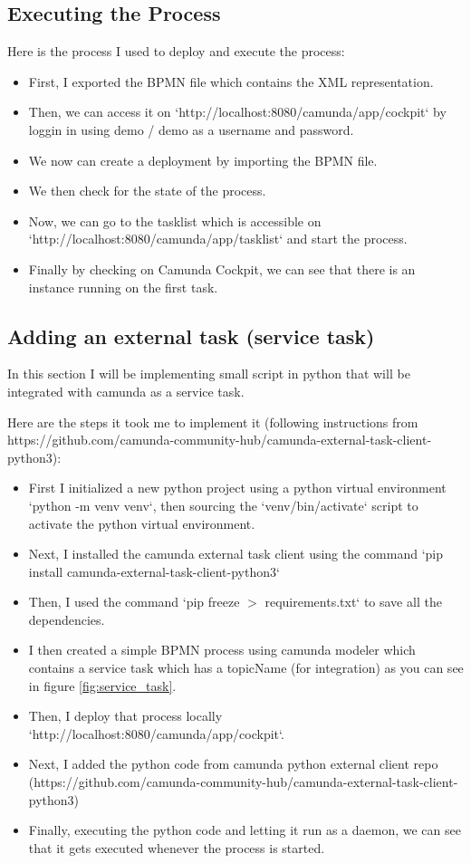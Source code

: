 \documentclass[12pt]{article}
\begin{document}
{  \subsection{Executing the Process}

  Here is the process I used to deploy and execute the process:

  \begin{itemize}
    \item First, I exported the BPMN file which contains the XML representation.
    \item Then, we can access it on `http://localhost:8080/camunda/app/cockpit` by loggin in using demo / demo as a username and password.
    \item We now can create a deployment by importing the BPMN file.
    \item We then check for the state of the process.
    \item Now, we can go to the tasklist which is accessible on `http://localhost:8080/camunda/app/tasklist` and start the process.
    \item Finally by checking on Camunda Cockpit, we can see that there is an instance running on the first task.
  \end{itemize}

  \subsection{Adding an external task (service task)}

  In this section I will be implementing small script in python that will be integrated with camunda as a service task.

  Here are the steps it took me to implement it (following instructions from https://github.com/camunda-community-hub/camunda-external-task-client-python3):

  \begin{itemize}
    \item First I initialized a new python project using a python virtual environment `python -m venv venv`, then sourcing the `venv/bin/activate` script to activate the python virtual environment.
    \item Next, I installed the camunda external task client using the command `pip install camunda-external-task-client-python3`
    \item Then, I used the command `pip freeze $ > $ requirements.txt` to save all the dependencies.
    \item I then created a simple BPMN process using camunda modeler which contains a service task which has a topicName (for integration) as you can see in figure \ref{fig:service_task}.
    \item Then, I deploy that process locally `http://localhost:8080/camunda/app/cockpit`.
    \item Next, I added the python code from camunda python external client repo (https://github.com/camunda-community-hub/camunda-external-task-client-python3)
    \item Finally, executing the python code and letting it run as a daemon, we can see that it gets executed whenever the process is started.
  \end{itemize}

}
\end{document}
